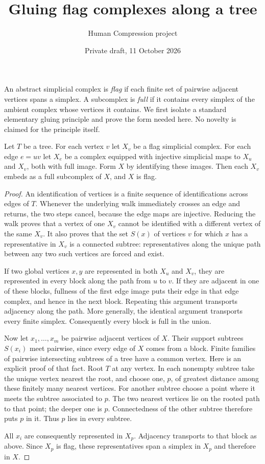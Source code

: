 
\title{Gluing flag complexes along a tree}
\author{Human Compression project}
\date{Private draft, 11 October 2026}

\maketitle

An abstract simplicial complex is \emph{flag} if each finite set of pairwise
adjacent vertices spans a simplex. A subcomplex is \emph{full} if it contains
every simplex of the ambient complex whose vertices it contains. We first
isolate a standard elementary gluing principle and prove the form needed
here. No novelty is claimed for the principle itself.

\begin{lemma}\label{lem:tree}
Let $T$ be a tree. For each vertex $v$ let $X_v$ be a flag simplicial
complex. For each edge $e=uv$ let $X_e$ be a complex equipped with
injective simplicial maps to $X_u$ and $X_v$, both with full image.
Form $X$ by identifying these images. Then each $X_v$ embeds as a full
subcomplex of $X$, and $X$ is flag.
\end{lemma}
\begin{proof}
An identification of vertices is a finite sequence of identifications
across edges of $T$. Whenever the underlying walk immediately crosses an
edge and returns, the two steps cancel, because the edge maps are
injective. Reducing the walk proves that a vertex of one $X_v$ cannot
be identified with a different vertex of the same $X_v$. It also proves
that the set $S(x)$ of vertices $v$ for which $x$ has a representative
in $X_v$ is a connected subtree: representatives along the unique path
between any two such vertices are forced and exist.

If two global vertices $x,y$ are represented in both $X_u$ and $X_v$,
they are represented in every block along the path from $u$ to $v$.
If they are adjacent in one of these blocks, fullness of the first edge
image puts their edge in that edge complex, and hence in the next block.
Repeating this argument transports adjacency along the path. More
generally, the identical argument transports every finite simplex.
Consequently every block is full in the union.

Now let $x_1,\ldots,x_m$ be pairwise adjacent vertices of $X$.
Their support subtrees $S(x_i)$ meet pairwise, since every edge of $X$
comes from a block. Finite families of pairwise intersecting subtrees
of a tree have a common vertex. Here is an explicit proof of that fact.
Root $T$ at any vertex. In each nonempty subtree take the unique vertex
nearest the root, and choose one, $p$, of greatest distance among these
finitely many nearest vertices. For another subtree choose a point where
it meets the subtree associated to $p$. The two nearest vertices lie on
the rooted path to that point; the deeper one is $p$. Connectedness of
the other subtree therefore puts $p$ in it. Thus $p$ lies in every subtree.

All $x_i$ are consequently represented in $X_p$. Adjacency transports
to that block as above. Since $X_p$ is flag, these representatives span
a simplex in $X_p$ and therefore in $X$.
\end{proof}

